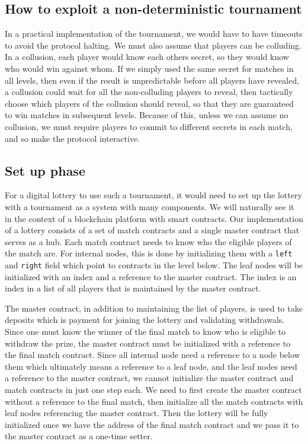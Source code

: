 \subsection{How to exploit a non-deterministic tournament}  %
In a practical implementation of the tournament, we would have to have timeouts to avoid the protocol halting. We must also assume that players can be colluding. In a collusion, each player would know each others secret, so they would know who would win against whom. If we simply used the same secret for matches in all levels, then even if the result is unpredictable before all players have revealed, a collusion could wait for all the non-colluding players to reveal, then tactically choose which players of the collusion should reveal, so that they are guaranteed to win matches in subsequent levels. Because of this, unless we can assume no collusion, we must require players to commit to different secrets in each match, and so make the protocol interactive.

\subsection{Set up phase}
For a digital lottery to use such a tournament, it would need to set up the lottery with a tournament as a system with many components. We will naturally see it in the context of a blockchain platform with smart contracts. Our implementation of a lottery consists of a set of match contracts and a single master contract that serves as a hub. Each match contract needs to know who the eligible players of the match are. For internal nodes, this is done by initializing them with a \texttt{left} and \texttt{right} field which point to contracts in the level below. The leaf nodes will be initialized with an index and a reference to the master contract. The index is an index in a list of all players that is maintained by the master contract.

The master contract, in addition to maintaining the list of players, is used to take deposits which is payment for joining the lottery and validating withdrawals. Since one must know the winner of the final match to know who is eligible to withdraw the prize, the master contract must be initialized with a reference to the final match contract. Since all internal node need a reference to a node below them which ultimately means a reference to a leaf node, and the leaf nodes need a reference to the master contract, we cannot initialize the master contract and match contracts in just one step each. We need to first create the master contract without a reference to the final match, then initialize all the match contracts with leaf nodes referencing the master contract. Then the lottery will be fully initialized once we have the address of the final match contract and we pass it to the master contract as a one-time setter.

